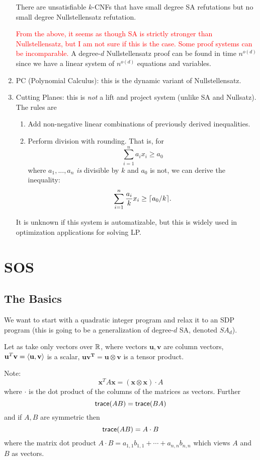 \begin{enumerate}
\begin{theorem}
There are unsatisfiable $k$-CNFs that have small degree SA refutations but no small degree Nullstellensatz refutation. 
\end{theorem}

\textcolor{red}{From the above, it seems as though SA is strictly stronger than Nullstellensatz, but I am not sure if this is the case. Some proof systems can be incomparable.} A degree-$d$ Nullstellensatz proof can be found in time $n^{o(d)}$ since we have a linear system of $n^{o(d)}$ equations and variables. 
\item PC (Polynomial Calculus): this is the dynamic variant of Nullstellensatz. 
\item Cutting Planes: this is \emph{not} a lift and project system (unlike SA and Nullsatz). The rules are
\begin{enumerate}
\item Add non-negative linear combinations of previously derived inequalities.
\item Perform division with rounding. That is, for
\[\sum_{i=1}^{n}a_ix_i \geq a_0\]
where $a_1, ..., a_n$ \emph{is} divisible by $k$ and $a_0$ is not, we can derive the inequality:
\[\sum_{i=1}^{n} \frac{a_i}{k}x_i \geq \lceil a_0/k\rceil.\]
\end{enumerate}
It is unknown if this system is automatizable, but this is widely used in optimization applications for solving LP.
\end{enumerate} 

\section{SOS}
\subsection{The Basics}
We want to start with a quadratic integer program and relax it to an SDP program (this is going to be a generalization of degree-$d$ SA, denoted $SA_d$).

Let as take only vectors over $\mathbb{R}$, where vectors $\mathbf{u}, \mathbf{v}$ are column vectors, $\mathbf{u}^T\mathbf{v} = \langle\mathbf{u}, \mathbf{v}\rangle$ is a scalar, $\mathbf{u}\mathbf{{v}^T} = \mathbf{u} \otimes \mathbf{v}$ is a tensor product. 

Note: 
\[\mathbf{x}^TA \mathbf{x} = (\mathbf{x}\otimes\mathbf{x}) \cdot A\]
where $\cdot$ is the dot product of the columns of the matrices as vectors. Further 
\[\mathsf{trace}(AB) = \mathsf{trace}(BA)\]
and if $A, B$ are symmetric then 
\[\mathsf{trace}(AB) = A \cdot B\]
where the matrix dot product $A \cdot B = a_{1,1}b_{1,1} + \cdots + a_{n,n}b_{n,n}$ which views $A$ and $B$ as vectors.

